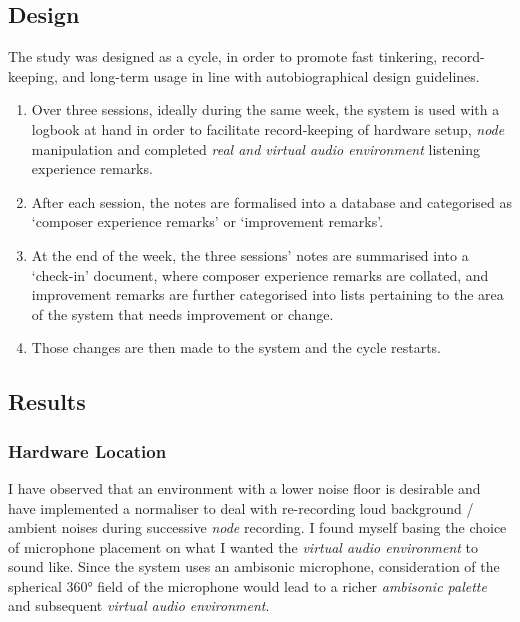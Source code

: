 \subsection{Design}\label{sec: area-study-design}
The study was designed as a cycle, in order to promote fast tinkering, record-keeping, and long-term usage in line with autobiographical design guidelines. 
\begin{enumerate}
    \item Over three sessions, ideally during the same week, the system is used with a logbook at hand in order to facilitate record-keeping of hardware setup, \textit{node} manipulation and completed \textit{real and virtual audio environment} listening experience remarks.
    \item After each session, the notes are formalised into a database and categorised as `composer experience remarks' or `improvement remarks'.
    \item At the end of the week, the three sessions' notes are summarised into a `check-in' document, where composer experience remarks are collated, and improvement remarks are further categorised into lists pertaining to the area of the system that needs improvement or change.
    \item Those changes are then made to the system and the cycle restarts.
\end{enumerate}

\subsection{Results}\label{sec: area-study-results}
\subsubsection{Hardware Location}\label{sec: area-study-results-hwloc}
I have observed that an environment with a lower noise floor is desirable and have implemented a normaliser to deal with re-recording loud background / ambient noises during successive \textit{node} recording. I found myself basing the choice of microphone placement on what I wanted the \textit{virtual audio environment} to sound like. Since the system uses an ambisonic microphone, consideration of the spherical 360° field of the microphone would lead to a richer \textit{ambisonic palette} and subsequent \textit{virtual audio environment}.

